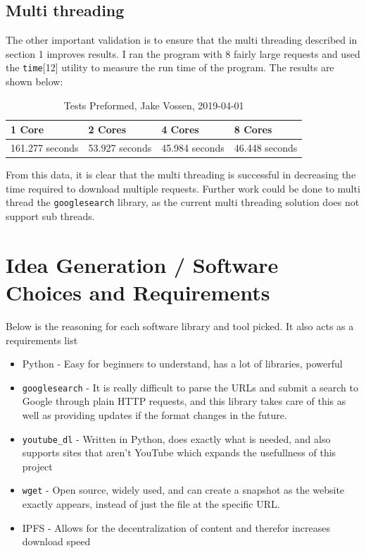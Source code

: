 \documentclass{article}
\begin{document}
\subsection{Multi threading}
\label{multithreading}
The other important validation is to ensure that the multi threading
described in section 1 improves results. I ran the program with 8
fairly large requests and used the \texttt{time}[12] utility to measure
the run time of the program. The results are shown below:

\begin{table}[H]
\centering
\caption{\begingroup \fontsize{10pt}{12pt}\selectfont Tests Preformed,
Jake Vossen, 2019-04-01 \endgroup}
\label{my-label}
\begin{tabular}{l|l|l|l}
                                      1 Core  & 2 Cores & 4 Cores & 8
                                                                    Cores
  \\ \hline
 161.277 seconds & 53.927  seconds & 45.984  seconds & 46.448 seconds
\end{tabular}
\end{table}
From this data, it is clear that the multi threading is
successful in decreasing the time required to download multiple requests.
Further work could be done to multi thread the \texttt{googlesearch}
library, as the current multi threading solution does not support sub threads.
\section{Idea Generation / Software Choices and Requirements}

Below is the reasoning for each software library and tool picked. It
also acts as a requirements list

\begin{itemize}
  \item Python - Easy for beginners to understand, has a lot of
    libraries, powerful
  \item \texttt{googlesearch} - It is really difficult to parse the
    URLs and submit a search to Google through plain HTTP requests,
    and this library takes care of this as well as providing updates
    if the format changes in the future.
  \item \texttt{youtube\_dl} - Written in Python, does exactly what is
    needed, and also supports sites that aren't YouTube which expands
    the usefullness of this project
  \item \texttt{wget} - Open source, widely used, and can create a
    snapshot as the website exactly appears, instead of just the file
    at the specific URL.
  \item IPFS - Allows for the decentralization of content and therefor
    increases download speed
\end{itemize}
\end{document}
